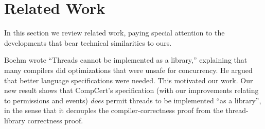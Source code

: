 
\chapter{Related Work\label{ch:relatedwork}}

In this section we review related work, paying special attention to the developments that bear technical similarities to ours. 

Boehm wrote ``Threads cannot be implemented as a library,''
\cite{boehm05}
explaining that many compilers did optimizations that were unsafe
for concurrency. He argued that better language specifications
were needed.  This motivated our work.
Our new result shows that CompCert's specification
(with our improvements relating to permissions and events)
\emph{does} permit threads to be implemented
``as a library'', in the sense that it decouples the
compiler-correctness proof from the thread-library correctness
proof.







